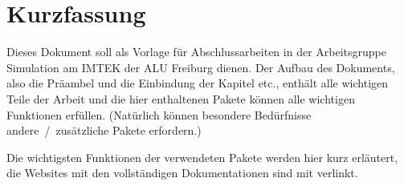 \chapter*{Kurzfassung}
Dieses Dokument soll als Vorlage für Abschlussarbeiten in der Arbeitsgruppe Simulation am \gls{IMTEK} der \gls{ALU} Freiburg dienen.
Der Aufbau des Dokuments, also die Präambel und die Einbindung der Kapitel etc., enthält alle wichtigen Teile der Arbeit und die hier enthaltenen Pakete können alle wichtigen Funktionen erfüllen. (Natürlich können besondere Bedürfnisse andere~/~zusätzliche Pakete erfordern.)

Die wichtigsten Funktionen der verwendeten Pakete werden hier kurz erläutert, die Websites mit den vollständigen Dokumentationen sind mit verlinkt.